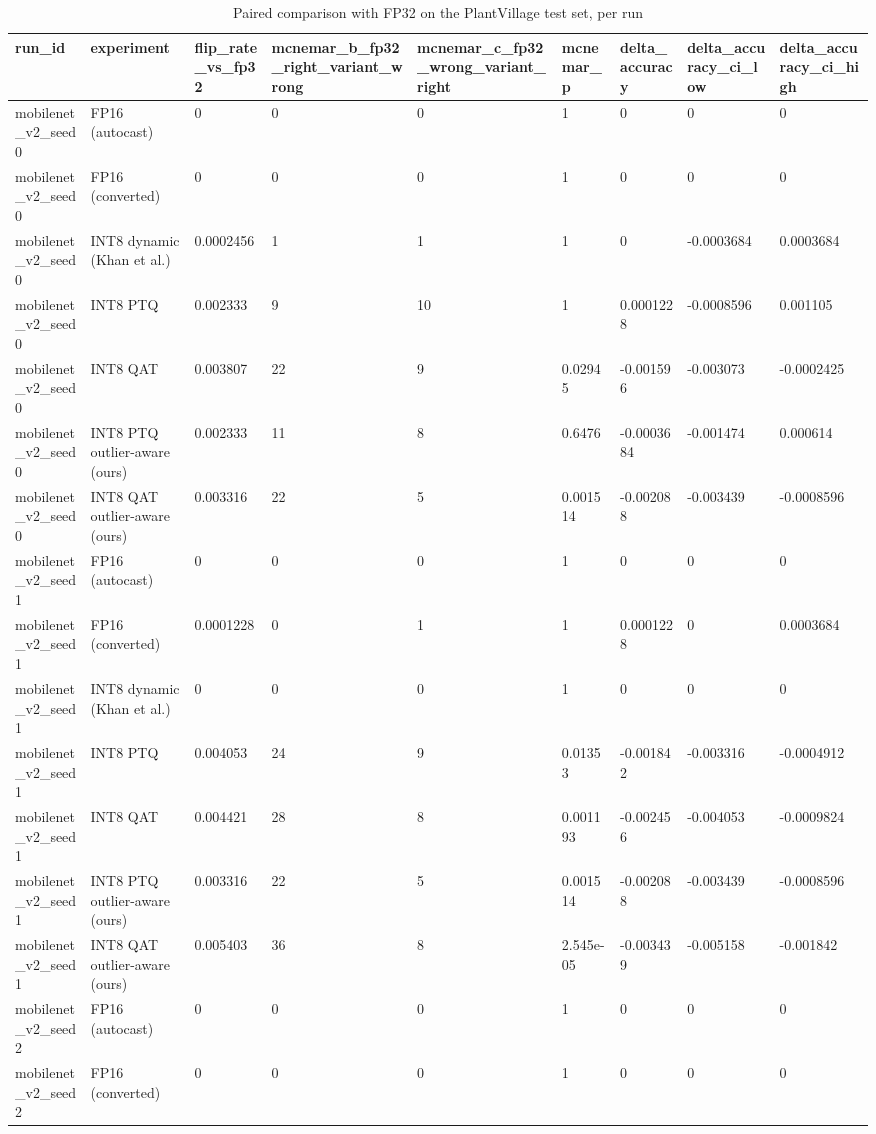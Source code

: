 \begin{table}[t]
\centering
\caption{Paired comparison with FP32 on the PlantVillage test set, per run}
\label{tab:tab05_paired_tests}
\small
\begin{tabular}{lllllllll}
\toprule
run\_id & experiment & flip\_rate\_vs\_fp32 & mcnemar\_b\_fp32\_right\_variant\_wrong & mcnemar\_c\_fp32\_wrong\_variant\_right & mcnemar\_p & delta\_accuracy & delta\_accuracy\_ci\_low & delta\_accuracy\_ci\_high \\
\midrule
mobilenet\_v2\_seed0 & FP16 (autocast) & 0 & 0 & 0 & 1 & 0 & 0 & 0 \\
mobilenet\_v2\_seed0 & FP16 (converted) & 0 & 0 & 0 & 1 & 0 & 0 & 0 \\
mobilenet\_v2\_seed0 & INT8 dynamic (Khan et al.) & 0.0002456 & 1 & 1 & 1 & 0 & -0.0003684 & 0.0003684 \\
mobilenet\_v2\_seed0 & INT8 PTQ & 0.002333 & 9 & 10 & 1 & 0.0001228 & -0.0008596 & 0.001105 \\
mobilenet\_v2\_seed0 & INT8 QAT & 0.003807 & 22 & 9 & 0.02945 & -0.001596 & -0.003073 & -0.0002425 \\
mobilenet\_v2\_seed0 & INT8 PTQ outlier-aware (ours) & 0.002333 & 11 & 8 & 0.6476 & -0.0003684 & -0.001474 & 0.000614 \\
mobilenet\_v2\_seed0 & INT8 QAT outlier-aware (ours) & 0.003316 & 22 & 5 & 0.001514 & -0.002088 & -0.003439 & -0.0008596 \\
mobilenet\_v2\_seed1 & FP16 (autocast) & 0 & 0 & 0 & 1 & 0 & 0 & 0 \\
mobilenet\_v2\_seed1 & FP16 (converted) & 0.0001228 & 0 & 1 & 1 & 0.0001228 & 0 & 0.0003684 \\
mobilenet\_v2\_seed1 & INT8 dynamic (Khan et al.) & 0 & 0 & 0 & 1 & 0 & 0 & 0 \\
mobilenet\_v2\_seed1 & INT8 PTQ & 0.004053 & 24 & 9 & 0.01353 & -0.001842 & -0.003316 & -0.0004912 \\
mobilenet\_v2\_seed1 & INT8 QAT & 0.004421 & 28 & 8 & 0.001193 & -0.002456 & -0.004053 & -0.0009824 \\
mobilenet\_v2\_seed1 & INT8 PTQ outlier-aware (ours) & 0.003316 & 22 & 5 & 0.001514 & -0.002088 & -0.003439 & -0.0008596 \\
mobilenet\_v2\_seed1 & INT8 QAT outlier-aware (ours) & 0.005403 & 36 & 8 & 2.545e-05 & -0.003439 & -0.005158 & -0.001842 \\
mobilenet\_v2\_seed2 & FP16 (autocast) & 0 & 0 & 0 & 1 & 0 & 0 & 0 \\
mobilenet\_v2\_seed2 & FP16 (converted) & 0 & 0 & 0 & 1 & 0 & 0 & 0 \\

\end{tabular}
\end{table}
